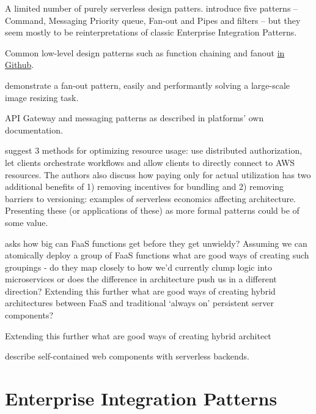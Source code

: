 \documentclass[utf8,english]{gradu3}
\begin{document}

A limited number of purely serverless design patters. \textcite{sbarski2017serverless} introduce five patterns -- Command, Messaging Priority queue, Fan-out and Pipes and filters -- but they seem mostly to be reinterpretations of classic Enterprise Integration Patterns.

Common low-level design patterns such as function chaining and fanout \href{https://github.com/yochay/serverlesspatterns}{in Github}.

\textcite{mcgrath16cloudEventParadigms} demonstrate a fan-out pattern, easily and performantly solving a large-scale image resizing task.

API Gateway and messaging patterns as described in platforms' own documentation. \parencite{awslambda0218}

\textcite{adzic2017serverless} suggest 3 methods for optimizing resource usage: use distributed authorization, let clients orchestrate workflows and allow clients to directly connect to AWS resources. The authors also discuss how paying only for actual utilization has two additional benefits of 1) removing incentives for bundling and 2) removing barriers to versioning: examples of serverless economics affecting architecture. Presenting these (or applications of these) as more formal patterns could be of some value.

\textcite{robert2016serverlessarchitectures} asks how big can FaaS functions get before they get unwieldy? Assuming we can atomically deploy a group of FaaS functions what are good ways of creating such groupings - do they map closely to how we’d currently clump logic into microservices or does the difference in architecture push us in a different direction? Extending this further what are good ways of creating hybrid architectures between FaaS and traditional ‘always on’ persistent server components?

Extending this further what are good ways of creating hybrid architect

\textcite{ast17webcomponent} describe self-contained web components with serverless backends.

\section{Enterprise Integration Patterns}
\end{document}
